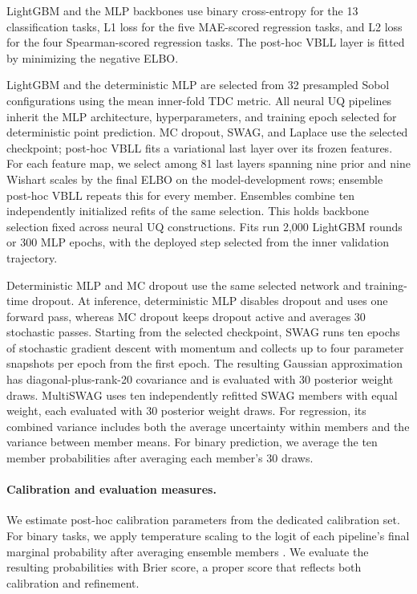 LightGBM and the MLP backbones use binary cross-entropy for the 13 classification tasks, L1 loss for
the five MAE-scored regression tasks, and L2 loss for the four Spearman-scored regression tasks.
The post-hoc VBLL layer is fitted by minimizing the negative ELBO.

LightGBM and the deterministic MLP are selected from 32 presampled Sobol configurations using the
mean inner-fold TDC metric. All neural UQ pipelines inherit the MLP architecture, hyperparameters,
and training epoch selected for deterministic point prediction. MC dropout, SWAG, and Laplace use
the selected checkpoint; post-hoc VBLL fits a variational last layer over its frozen features. For
each feature map, we select among 81 last layers spanning nine prior and nine Wishart scales by the
final ELBO on the model-development rows; ensemble post-hoc VBLL repeats this for every member.
Ensembles combine ten independently initialized refits of the same selection. This holds backbone
selection fixed across neural UQ constructions. Fits run 2,000 LightGBM rounds or 300 MLP epochs,
with the deployed step selected from the inner validation trajectory.

Deterministic MLP and MC dropout use the same selected network and training-time dropout. At
inference, deterministic MLP disables dropout and uses one forward pass, whereas MC dropout keeps
dropout active and averages 30 stochastic passes. Starting from the selected checkpoint, SWAG runs
ten epochs of stochastic gradient descent with momentum and collects up to four parameter snapshots
per epoch from the first epoch. The resulting Gaussian approximation has diagonal-plus-rank-20 covariance
and is evaluated with 30 posterior weight draws. MultiSWAG
uses ten independently refitted SWAG members with equal weight, each evaluated with 30 posterior
weight draws. For regression, its combined variance includes both the average uncertainty within
members and the variance between member means. For binary prediction, we average the ten member
probabilities after averaging each member's 30 draws.

\paragraph{Calibration and evaluation measures.}
We estimate post-hoc calibration parameters from the dedicated calibration set. For binary tasks,
we apply temperature scaling to the logit of each pipeline's final marginal probability after
averaging ensemble members \citep{guo2017calibration}. We evaluate the resulting probabilities with
Brier score, a proper score that reflects both calibration and refinement.

